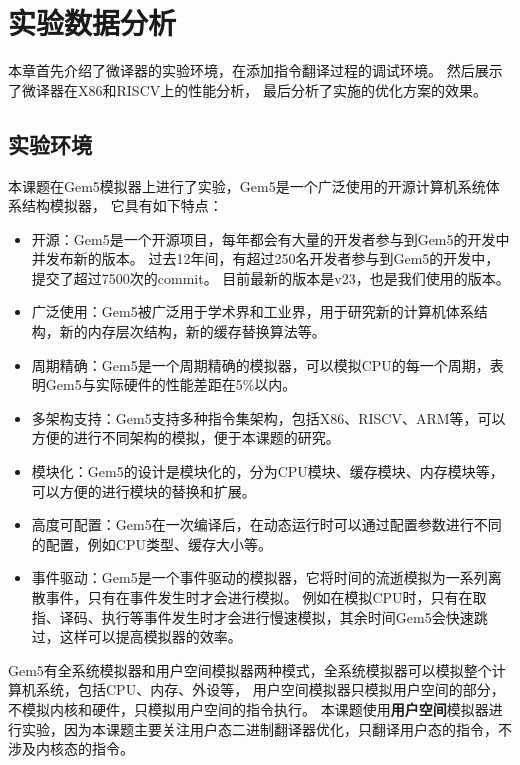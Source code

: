 \chapter{实验数据分析}\label{chap:Epxeriment}

本章首先介绍了微译器的实验环境，在添加指令翻译过程的调试环境。
然后展示了微译器在X86和RISCV上的性能分析，
最后分析了实施的优化方案的效果。

\section{实验环境}

本课题在Gem5模拟器\cite{gem5OriginalPaper}上进行了实验，Gem5是一个广泛使用的开源计算机系统体系结构模拟器，
它具有如下特点：
\begin{itemize}
  \item 开源：Gem5是一个开源项目，每年都会有大量的开发者参与到Gem5的开发中并发布新的版本。
  过去12年间，有超过250名开发者参与到Gem5的开发中，提交了超过7500次的commit\cite{Gem5SimulatorVersion2020}。
  目前最新的版本是v23，也是我们使用的版本。
  \item 广泛使用：Gem5被广泛用于学术界和工业界，用于研究新的计算机体系结构，新的内存层次结构，新的缓存替换算法等。
  \item 周期精确：Gem5是一个周期精确的模拟器，可以模拟CPU的每一个周期，\cite{Butko2012AccuracyEO}表明Gem5与实际硬件的性能差距在5\%以内。
  \item 多架构支持：Gem5支持多种指令集架构，包括X86、RISCV、ARM等，可以方便的进行不同架构的模拟，便于本课题的研究。
  \item 模块化：Gem5的设计是模块化的，分为CPU模块、缓存模块、内存模块等，可以方便的进行模块的替换和扩展。
  \item 高度可配置：Gem5在一次编译后，在动态运行时可以通过配置参数进行不同的配置，例如CPU类型、缓存大小等。
  \item 事件驱动：Gem5是一个事件驱动的模拟器，它将时间的流逝模拟为一系列离散事件，只有在事件发生时才会进行模拟。
  例如在模拟CPU时，只有在取指、译码、执行等事件发生时才会进行慢速模拟，其余时间Gem5会快速跳过，这样可以提高模拟器的效率。
\end{itemize}

Gem5有全系统模拟器和用户空间模拟器两种模式，全系统模拟器可以模拟整个计算机系统，包括CPU、内存、外设等，
用户空间模拟器只模拟用户空间的部分，不模拟内核和硬件，只模拟用户空间的指令执行\cite{gem5OriginalPaper}。
本课题使用\textbf{用户空间}模拟器进行实验，因为本课题主要关注用户态二进制翻译器优化，只翻译用户态的指令，不涉及内核态的指令。

